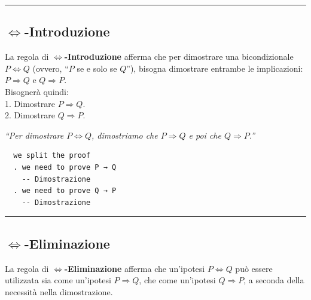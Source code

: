 \documentclass[
  a4paper,
]{article}
\begin{document}
\par\noindent\rule{\linewidth}{0.4pt}\par\vspace{6pt}

\hypertarget{iff-introduzione}{%
\subsection{\texorpdfstring{\(\iff\)-Introduzione}{\textbackslash iff-Introduzione}}\label{iff-introduzione}}

La regola di \textbf{\(\iff\)-Introduzione} afferma che per dimostrare
una bicondizionale \(P \iff Q\) (ovvero, ``\(P\) se e solo se \(Q\)''),
bisogna dimostrare entrambe le implicazioni: \(P \Rightarrow Q\) e
\(Q \Rightarrow P\).\\
Bisognerà quindi:\\
1. Dimostrare \(P \Rightarrow Q\).\\
2. Dimostrare \(Q \Rightarrow P\).

\begin{examplebox}[Esempio]

\emph{``Per dimostrare \(P \iff Q\), dimostriamo che \(P \Rightarrow Q\)
e poi che \(Q \Rightarrow P\).''}

\end{examplebox}

\begin{examplebox}

\begin{lstlisting}
  we split the proof
  . we need to prove P → Q
    -- Dimostrazione
  . we need to prove Q → P
    -- Dimostrazione
\end{lstlisting}

\end{examplebox}

\par\noindent\rule{\linewidth}{0.4pt}\par\vspace{6pt}

\hypertarget{iff-eliminazione}{%
\subsection{\texorpdfstring{\(\iff\)-Eliminazione}{\textbackslash iff-Eliminazione}}\label{iff-eliminazione}}

La regola di \textbf{\(\iff\)-Eliminazione} afferma che un'ipotesi
\(P \iff Q\) può essere utilizzata sia come un'ipotesi
\(P \Rightarrow Q\), che come un'ipotesi \(Q \Rightarrow P\), a seconda
della necessità nella dimostrazione.
\end{document}
